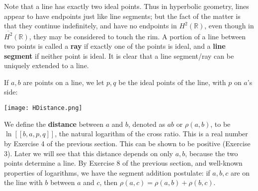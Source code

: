 \documentclass[leqno]{book}
\begin{document}
Note that a line has exactly two ideal points.  Thus in hyperbolic geometry, lines appear to have endpoints just like line segments; but the fact of the matter is that they continue indefinitely, and have no endpoints in $H^2(\mathbb R)$, even though in $\overline{H^2}(\mathbb R)$, they may be considered to touch the rim.  A portion of a line between two points is called a \textbf{ray} if exactly one of the points is ideal, and a \textbf{line segment} if neither point is ideal.  It is clear that a line segment/ray can be uniquely extended to a line.

If $a,b$ are points on a line, we let $p,q$ be the ideal points of the line, with $p$ on $a$'s side:
\begin{center}\texttt{[image: HDistance.png]}\end{center}
We define the \textbf{distance} between $a$ and $b$, denoted as $ab$ or $\rho(a,b)$, to be $\ln[\![b,a,p,q]\!]$, the natural logarithm of the cross ratio.  This is a real number by Exercise 4 of the previous section.  This can be shown to be positive (Exercise 3).  Later we will see that this distance depends on only $a,b$, because the two points determine a line.  By Exercise 8 of the previous section, and well-known properties of logarithms, we have the segment addition postulate: if $a,b,c$ are on the line with $b$ between $a$ and $c$, then $\rho(a,c)=\rho(a,b)+\rho(b,c)$. %
\end{document}
